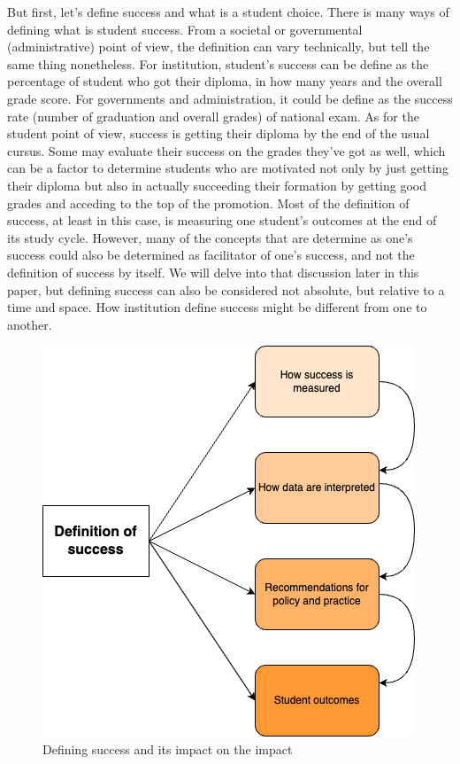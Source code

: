 \documentclass[../../main.tex]{subfiles}
\begin{document}
But first, let's define success and what is a student choice. There is many ways of defining what is student success. From a societal or governmental (administrative) point of view, the definition can vary technically, but tell the same thing nonetheless. For institution, student's success can be define as the percentage of student who got their diploma, in how many years and the overall grade score. For governments and administration, it could be define as the success rate (number of graduation and overall grades) of national exam. As for the student point of view, success is getting their diploma by the end of the usual cursus. Some may evaluate their success on the grades they've got as well, which can be a factor to determine students who are motivated not only by just getting their diploma but also in actually succeeding their formation by getting good grades and acceding to the top of the promotion.
Most of the definition of success, at least in this case, is measuring one student's outcomes at the end of its study cycle. However, many of the concepts that are determine as one's success could also be determined as facilitator of one's success, and not the definition of success by itself.
We will delve into that discussion later in this paper, but defining success can also be considered not absolute, but relative to a time and space. How institution define success might be different from one to another.\cite{weatherton_success_2021}
\begin{figure}[H]
    \centering
    \includegraphics[width=1\linewidth]{res//diagram/sucess-definition-graph.png}
    \caption{Defining success and its impact on the impact\cite{weatherton_success_2021}}
    \label{fig:success_impact}
\end{figure}
\end{document}
